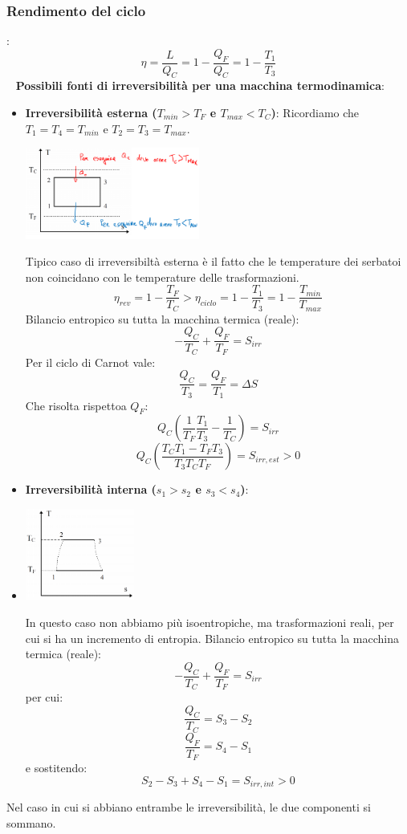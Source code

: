 \subsubsection{Rendimento del ciclo}:
\[
    \eta = \frac{L}{Q_C} = 1-\frac{Q_F}{Q_C} = 1- \frac{T_1}{T_3}    
\]
\ \newline
\newline
\textbf{Possibili fonti di irreversibilità per una macchina termodinamica}:
\begin{itemize}
    \item \textbf{Irreversibilità esterna ($T_{min} > T_F$ e $T_{max} < T_C$)}:\newline
    Ricordiamo che $T_1 = T_4 = T_{min}$ e $T_2 = T_3 = T_{max}$.
    \begin{center}
        \includegraphics[height=3cm]{../L07/img3.PNG}
    \end{center}
    Tipico caso di irreversibiltà esterna è il fatto che le temperature dei serbatoi non coincidano con le temperature delle trasformazioni.
    \[
        \eta_{rev} = 1-\frac{T_F}{T_C} > \eta_{ciclo} = 1- \frac{T_1}{T_3} = 1- \frac{T_{min}}{T_{max}}
    \]
    Bilancio entropico su tutta la macchina termica (reale):
    \[
        -\frac{Q_C}{T_C} + \frac{Q_F}{T_F} = S_{irr}
    \]
    Per il ciclo di Carnot vale:
    \[
        \frac{Q_C}{T_3} = \frac{Q_F}{T_1} = \Delta S
    \]
    Che risolta rispettoa $Q_F$:
    \[
        Q_C\left(\frac{1}{T_F} \frac{T_1}{T_3} - \frac{1}{T_C}\right) = S_{irr}
    \]
    \[
        Q_C \left(\frac{T_C T_1 - T_F T_3}{T_3T_CT_F}\right) = S_{irr, est} > 0
    \]
    \item \textbf{Irreversibilità interna ($s_1 > s_2$ e $s_3 < s_4$)}:
    \item \begin{center}
        \includegraphics[height=3cm]{../L07/img4.PNG}
    \end{center}
    In questo caso non abbiamo più isoentropiche, ma trasformazioni reali, per cui si ha un incremento di entropia.\newline
    Bilancio entropico su tutta la macchina termica (reale):
    \[
        - \frac{Q_C}{T_C} + \frac{Q_F}{T_F} = S_{irr}
    \]
    per cui:
    \[
        \frac{Q_C}{T_C} = S_3 - S_2
    \]
    \[
        \frac{Q_F}{T_F} = S_4 - S_1
    \]
    e sostitendo:
    \[
        S_2-S_3 +S_4 -S_1 = S_{irr, int} > 0
    \]
\end{itemize}
Nel caso in cui si abbiano entrambe le irreversibilità, le due componenti si sommano.
